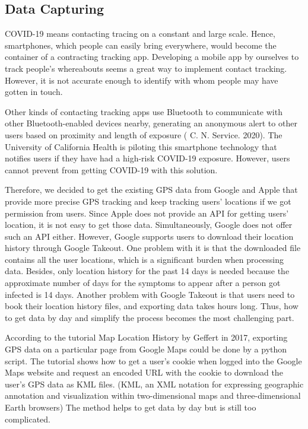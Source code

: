 \documentclass{ucsdreport}
\begin{document}
\subsection{Data Capturing}
COVID-19 means contacting tracing on a constant and large scale. Hence, 
smartphones, which people can easily bring everywhere, would become the 
container of a contracting tracking app. Developing a mobile app by ourselves 
to track people's whereabouts seems a great way to implement contact tracking. 
However, it is not accurate enough to identify with whom people may have gotten
in touch. 

Other kinds of contacting tracking apps use Bluetooth to communicate with other
Bluetooth-enabled devices nearby, generating an anonymous alert to other users 
based on proximity and length of exposure ( C. N. Service. 2020). The 
University of California Health is piloting this smartphone technology that 
notifies users if they have had a high-risk COVID-19 exposure. However, users 
cannot prevent from getting COVID-19 with this solution. 

Therefore, we decided to get the existing GPS data from Google and Apple that 
provide more precise GPS tracking and keep tracking users' locations if we got
permission from users. Since Apple does not provide an API for getting users' 
location, it is not easy to get those data. Simultaneously, Google does not 
offer such an API either. However, Google supports users to download their 
location history through Google Takeout. One problem with it is that the 
downloaded file contains all the user locations, which is a significant burden
when processing data. Besides, only location history for the past 14 days is 
needed because the approximate number of days for the symptoms to appear after 
a person got infected is 14 days. Another problem with Google Takeout is that 
users need to book their location history files, and exporting data takes hours 
long. Thus, how to get data by day and simplify the process becomes the most 
challenging part. 

According to the tutorial Map Location History by Geffert in 2017, exporting 
GPS data on a particular page from Google Maps could be done by a python script. 
The tutorial shows how to get a user's cookie when logged into the Google Maps
website and request an encoded URL with the cookie to download the user's GPS
data as KML files. (KML, an XML notation for expressing geographic annotation and 
visualization within two-dimensional maps and three-dimensional Earth browsers) 
The method helps to get data by day but is still too complicated.
\end{document}
